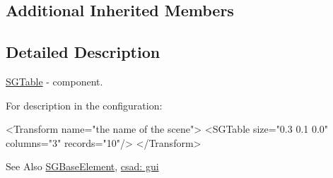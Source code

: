 \subsection*{Additional Inherited Members}


\subsection{Detailed Description}
\hyperlink{classcsad_1_1_s_g_table}{S\-G\-Table} -\/ component. 

For description in the configuration\-: \begin{DoxyVerb}  <Transform name="the name of the scene">
      <SGTable size="0.3 0.1 0.0" columns="3" records="10"/>
  </Transform>
\end{DoxyVerb}


\begin{DoxySeeAlso}{See Also}
\hyperlink{classcsad_1_1_s_g_base_element}{S\-G\-Base\-Element}, \hyperlink{group__scenegui}{csad\-: gui} 
\end{DoxySeeAlso}
